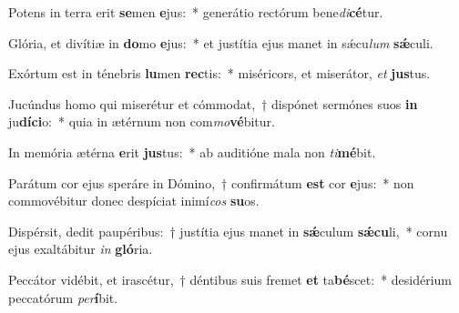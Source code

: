 \item Potens in terra erit \textbf{se}men \textbf{e}jus:~* generátio rectórum bene\textit{di}\textbf{cé}tur.
\item Glória, et divítiæ in \textbf{do}mo \textbf{e}jus:~* et justítia ejus manet in sǽcu\textit{lum} \textbf{sǽ}culi.
\item Exórtum est in ténebris \textbf{lu}men \textbf{rec}tis:~* miséricors, et miserátor, \textit{et} \textbf{jus}tus.
\item Jucúndus homo qui miserétur et cómmodat,~† dispónet sermónes suos \textbf{in} ju\textbf{dí}\textbf{ci}o:~* quia in ætérnum non com\textit{mo}\textbf{vé}bitur.
\item In memória ætérna \textbf{e}rit \textbf{jus}tus:~* ab auditióne mala non \textit{ti}\textbf{mé}bit.
\item Parátum cor ejus speráre in Dómino,~† confirmátum \textbf{est} cor \textbf{e}jus:~* non commovébitur donec despíciat inimí\textit{cos} \textbf{su}os.
\item Dispérsit, dedit paupéribus:~† justítia ejus manet in \textbf{sǽ}culum \textbf{sǽ}\textbf{cu}li,~* cornu ejus exaltábitur \textit{in} \textbf{gló}ria.
\item Peccátor vidébit, et irascétur,~† déntibus suis fremet \textbf{et} ta\textbf{bé}scet:~* desidérium peccatórum \textit{per}\textbf{í}bit.
